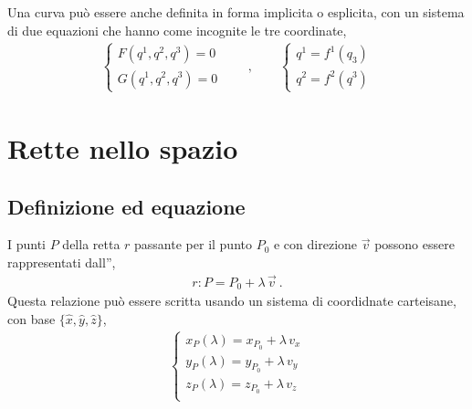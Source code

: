 \documentclass[letterpaper,10pt,italian]{jupyterBook}
\begin{document}
\sphinxAtStartPar
Una curva può essere anche definita in forma implicita o esplicita, con un sistema di due equazioni che hanno come incognite le tre coordinate,
\begin{equation*}
\begin{split}
\begin{cases} F(q^1, q^2, q^3) = 0 \\ G(q^1, q^2, q^3) = 0 \end{cases} \qquad, \qquad
\begin{cases} q^1 = f^1(q_3) \\ q^2 = f^2(q^3) \end{cases}
\end{split}
\end{equation*}
\sphinxstepscope


\section{Rette nello spazio}
\label{\detokenize{ch/analytic_geometry/analytic_geometry_3d/lines:rette-nello-spazio}}\label{\detokenize{ch/analytic_geometry/analytic_geometry_3d/lines:geometry-analytic-3d-lines}}\label{\detokenize{ch/analytic_geometry/analytic_geometry_3d/lines::doc}}

\subsection{Definizione ed equazione}
\label{\detokenize{ch/analytic_geometry/analytic_geometry_3d/lines:definizione-ed-equazione}}
\sphinxAtStartPar
{} I punti \(P\) della retta \(r\) passante per il punto \(P_0\) e con direzione \(\vec{v}\) possono essere rappresentati dall”,
\begin{equation*}
\begin{split}r: P = P_0 + \lambda \, \vec{v} \ .\end{split}
\end{equation*}
\sphinxAtStartPar
Questa relazione può essere scritta usando un sistema di coordidnate carteisane, con base \(\{ \hat{x}, \hat{y}, \hat{z} \}\),
\begin{equation*}
\begin{split}\begin{cases}
x_P(\lambda) = x_{P_0} + \lambda \, v_x \\
y_P(\lambda) = y_{P_0} + \lambda \, v_y \\
z_P(\lambda) = z_{P_0} + \lambda \, v_z \\
\end{cases}\end{split}
\end{equation*}
\sphinxAtStartPar
{} 
\end{document}
